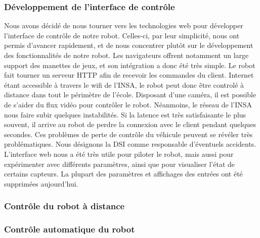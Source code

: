 \subsubsection{Développement de l'interface de contrôle}
Nous avons décidé de nous tourner vers les technologies web pour développer l'interface de contrôle de notre robot. Celles-ci, par leur simplicité, nous ont permis d'avancer rapidement, et de nous concentrer plutôt sur le développement des fonctionnalités de notre robot. Les navigateurs offrent notamment un large support des manettes de jeux, et son intégration a donc été très simple.
Le robot fait tourner un serveur HTTP afin de recevoir les commandes du client. Internet étant accessible à travers le wifi de l'INSA, le robot peut donc être controlé à distance dans tout le périmètre de l'école. Disposant d'une caméra, il est possible de s'aider du flux vidéo pour contrôler le robot.
Néanmoins, le réseau de l'INSA nous faire subir quelques instabilités. Si la latence est très satisfaisante le plus souvent, il arrive au robot de perdre la connexion avec le client pendant quelques secondes. Ces problèmes de perte de contrôle du véhicule peuvent se révéler très problématiques. Nous désignons la DSI comme responsable d'éventuels accidents.
L'interface web nous a été très utile pour piloter le robot, mais aussi pour expérimenter avec différents paramètres, ainsi que pour visualiser l'état de certains capteurs. La plupart des paramètres et affichages des entrées ont été supprimées aujourd'hui.

\subsubsection*{Contrôle du robot à distance}

\subsubsection*{Contrôle automatique du robot}
